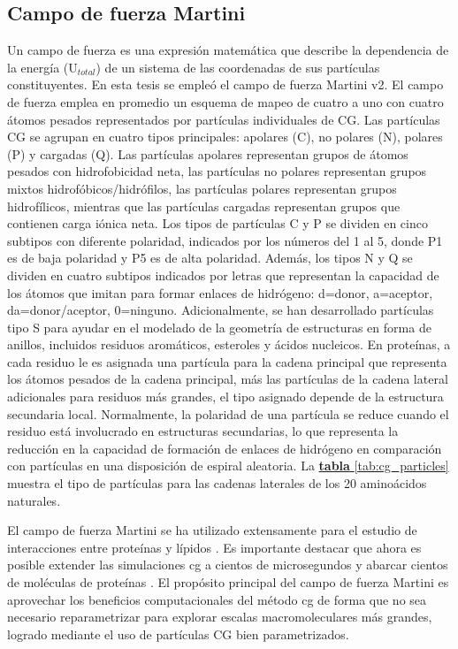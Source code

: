 \subsection{Campo de fuerza Martini}
Un campo de fuerza es una expresión matemática que describe la dependencia de la energía (U$_{total}$) de un sistema de las coordenadas de sus partículas constituyentes. En esta tesis se empleó el campo de fuerza Martini v2. El campo de fuerza emplea en promedio un esquema de mapeo de cuatro a uno con cuatro átomos pesados representados por partículas individuales de CG. Las partículas CG se agrupan en cuatro tipos principales: apolares (C), no polares (N), polares (P) y cargadas (Q). Las partículas apolares representan grupos de átomos pesados con hidrofobicidad neta, las partículas no polares representan grupos mixtos hidrofóbicos/hidrófilos, las partículas polares representan grupos hidrofílicos, mientras que las partículas cargadas representan grupos que contienen carga iónica neta. Los tipos de partículas C y P se dividen en cinco subtipos con diferente polaridad, indicados por los números del 1 al 5, donde P1 es de baja polaridad y P5 es de alta polaridad. Además, los tipos N y Q se dividen en cuatro subtipos indicados por letras que representan la capacidad de los átomos que imitan para formar enlaces de hidrógeno: d=donor, a=aceptor, da=donor/aceptor, 0=ninguno. Adicionalmente, se han desarrollado partículas tipo S para ayudar en el modelado de la geometría de estructuras en forma de anillos, incluidos residuos aromáticos, esteroles y ácidos nucleicos. 
En proteínas, a cada residuo le es asignada una partícula para la cadena principal que representa los átomos pesados de la cadena principal, más las partículas de la cadena lateral adicionales para residuos más grandes, el tipo asignado depende de la estructura secundaria local. Normalmente, la polaridad de una partícula se reduce cuando el residuo está involucrado en estructuras secundarias, lo que representa la reducción en la capacidad de formación de enlaces de hidrógeno en comparación con partículas en una disposición de espiral aleatoria. La \hyperref[tab:cg_particles]{\textbf{tabla} \ref*{tab:cg_particles}} muestra el tipo de partículas para las cadenas laterales de los 20 aminoácidos naturales.

El campo de fuerza Martini se ha utilizado extensamente para el estudio de interacciones entre proteínas y lípidos \citep{Claveras2023, Tieleman2021, Souza2020, Paramo2013,Periole2013}. Es importante destacar que ahora es posible extender las simulaciones \ac{cg} a cientos de microsegundos \citep{Arnarez2013} y abarcar cientos de moléculas de proteínas \citep{Koldsø2015}. El propósito principal del campo de fuerza Martini es aprovechar los beneficios computacionales del método \ac{cg} de forma que no sea necesario reparametrizar para explorar escalas macromoleculares más grandes, logrado mediante el uso de partículas CG bien parametrizados.


